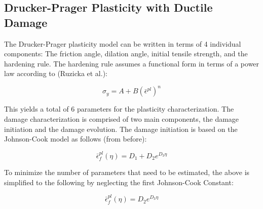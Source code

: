 \subsection{Drucker-Prager Plasticity with Ductile Damage}

The Drucker-Prager plasticity model can be written in terms of 4 individual
components: The friction angle, dilation angle, initial tensile strength,
and the hardening rule. The hardening rule assumes a functional form
in terms of a power law according to (Ruzicka et al.):

\begin{equation}
\sigma_{y}=A+B\left(\bar{\epsilon}^{pl}\right)^{n}\label{eqn:param5}
\end{equation}


This yields a total of 6 parameters for the plasticity characterization.
The damage characterization is comprised of two main components, the
damage initiation and the damage evolution. The damage initiation
is based on the Johnson-Cook model as follows (from before):

\begin{equation}
\bar{\epsilon}_{f}^{pl}\left(\eta\right)=D_{1}+D_{2}e^{D_{3}\eta}\label{eqn:param6}
\end{equation}


To minimize the number of parameters that need to be estimated, the
above is simplified to the following by neglecting the first Johnson-Cook
Constant:

\begin{equation}
\bar{\epsilon}_{f}^{pl}\left(\eta\right)=D_{2}e^{D_{3}\eta}\label{eqn:param6-1}
\end{equation}

